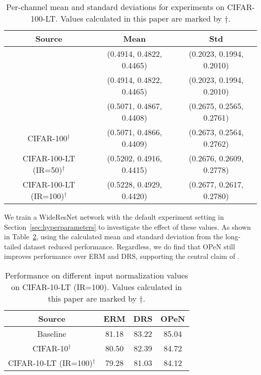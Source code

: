 \begin{table}[!ht]
    \centering
    \begin{tabular}{c|cc}
        Source & Mean & Std \\ \hline
        \citet{MiSLAS} & (0.4914, 0.4822, 0.4465) & (0.2023, 0.1994, 0.2010) \\
        \citet{LDAM-DRW} & (0.4914, 0.4822, 0.4465) & (0.2023, 0.1994, 0.2010) \\
        \citet{M2m} & (0.5071, 0.4867, 0.4408) & (0.2675, 0.2565, 0.2761) \\ \hline
        CIFAR-100$^{\dagger}$ & (0.5071, 0.4866, 0.4409) & (0.2673, 0.2564, 0.2762) \\
        CIFAR-100-LT (IR=50)$^{\dagger}$ & (0.5202, 0.4916, 0.4415) & (0.2676, 0.2609, 0.2778) \\
        CIFAR-100-LT (IR=100)$^{\dagger}$ & (0.5228, 0.4929, 0.4420) & (0.2677, 0.2617, 0.2780) \\
    \end{tabular}
    \caption{Per-channel mean and standard deviations for experiments on CIFAR-100-LT. Values calculated in this paper are marked by $\dagger$.}
    \label{tab:cifar100_input_norm_values}
\end{table}

We train a WideResNet network with the default experiment setting in Section~\ref{sec:hyperparameters} to investigate the effect of these values. As shown in Table~\ref{tab:cifar10_input_norm_perf}, using the calculated mean and standard deviation from the long-tailed dataset reduced performance. Regardless, we do find that OPeN still improves performance over ERM and DRS, supporting the central claim of \citet{PureNoise}.

\begin{table}[!ht]
    \centering
    \begin{tabular}{c|ccc}
        Source & ERM & DRS & OPeN \\ \hline
        Baseline \citep{MiSLAS, LDAM-DRW, M2m} & 81.18 & 83.22 & 85.04 \\
        CIFAR-10$^{\dagger}$ & 80.50 & 82.39 & 84.72 \\ 
        CIFAR-10-LT (IR=100)$^{\dagger}$ & 79.28 & 81.03 & 84.12 \\
    \end{tabular}
    \caption{Performance on different input normalization values on CIFAR-10-LT (IR=100). Values calculated in this paper are marked by $\dagger$.}
    \label{tab:cifar10_input_norm_perf}
\end{table}


